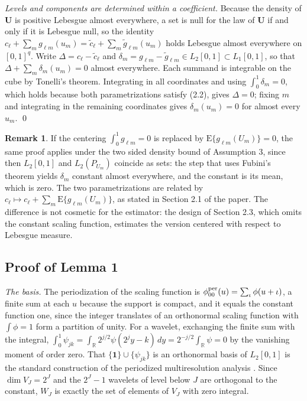\documentclass[10pt]{book}
\theoremstyle{definition}
\newtheorem{remark}{Remark}[section]
\newcommand{\R}{\mathbb{R}}
\newcommand{\E}{\mathrm{E}}
\newcommand{\cv}{\ell}
\newcommand{\md}{m}
\newcommand{\lev}{j}
\newcommand{\tsl}{k}
\newcommand{\bU}{\mathbf{U}}
\newcommand{\lvl}[1]{c_{#1}}
\newcommand{\gcomp}[2]{g_{#1#2}}
\newcommand{\wav}[2]{\psi_{#1#2}}
\newcommand{\VJ}{V_{J}}
\newcommand{\WJ}{W_{J}}
\begin{document}
\emph{Levels and components are determined within a coefficient.} Because the
density of $\bU$ is positive Lebesgue almost everywhere, a set is null for the
law of $\bU$ if and only if it is Lebesgue null, so the identity
$\lvl{\cv} + \sum_{\md}\gcomp{\cv}{\md}(u_{\md}) =
\tilde{c}_{\cv} + \sum_{\md}\tilde{g}_{\cv\md}(u_{\md})$ holds Lebesgue almost
everywhere on $[0,1]^q$. Write $\Delta = \lvl{\cv}-\tilde{c}_{\cv}$ and
$\delta_{\md} = \gcomp{\cv}{\md}-\tilde{g}_{\cv\md} \in L_2[0,1] \subset
L_1[0,1]$, so that $\Delta + \sum_{\md}\delta_{\md}(u_{\md}) = 0$ almost
everywhere. Each summand is integrable on the cube by Tonelli's theorem.
Integrating in all coordinates and using $\int_0^1\delta_{\md} = 0$, which
holds because both parametrizations satisfy (2.2), gives $\Delta = 0$; fixing
$\md$ and integrating in the remaining coordinates gives
$\delta_{\md}(u_{\md}) = 0$ for almost every $u_{\md}$. \qed

\begin{remark}
\label{rem:centering}
If the centering $\int_0^1 \gcomp{\cv}{\md} = 0$ is replaced by
$\E\{\gcomp{\cv}{\md}(U_{\md})\} = 0$, the same proof applies under the
two sided density bound of Assumption 3, since then $L_2[0,1]$ and
$L_2(P_{U_{\md}})$ coincide as sets: the step that uses Fubini's theorem
yields $\delta_{\md}$ constant almost everywhere, and the constant is its
mean, which is zero. The two parametrizations are related by
$\lvl{\cv} \mapsto \lvl{\cv} + \sum_{\md}\E\{\gcomp{\cv}{\md}(U_{\md})\}$, as
stated in Section 2.1 of the paper. The difference is not cosmetic for the
estimator: the design of Section 2.3, which omits the constant scaling
function, estimates the version centered with respect to Lebesgue measure.
\end{remark}

\subsection*{Proof of Lemma 1}

\emph{The basis.} The periodization of the scaling function is
$\phi^{\rm per}_{00}(u) = \sum_{\iota}\phi(u+\iota)$, a finite sum at each $u$
because the support is compact, and it equals the constant function one, since
the integer translates of an orthonormal scaling function with
$\int\phi = 1$ form a partition of unity. For a wavelet, exchanging the finite
sum with the integral,
$\int_0^1\wav{\lev}{\tsl} = \int_{\R}2^{\lev/2}\psi(2^{\lev}y-\tsl)\,dy =
2^{-\lev/2}\int_{\R}\psi = 0$ by the vanishing moment of order zero. That
$\{\mathbf{1}\}\cup\{\wav{\lev}{\tsl}\}$ is an orthonormal basis of $L_2[0,1]$
is the standard construction of the periodized multiresolution analysis
\citep[Section 9.3]{Daubechies-1992}. Since $\dim\VJ = 2^J$ and the $2^J-1$
wavelets of level below $J$ are orthogonal to the constant, $\WJ$ is exactly
the set of elements of $\VJ$ with zero integral.
\end{document}
